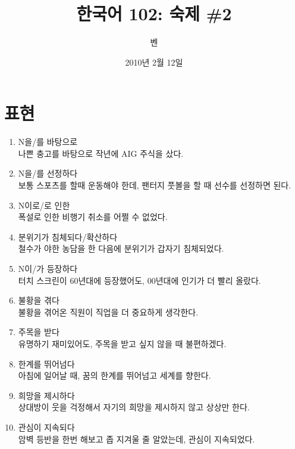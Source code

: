 \documentclass[11pt]{article}
\title{한국어 102: 숙제 \#2}
\author{벤}
\date{2010년 2월 12일}
\begin{document}
\maketitle
\thispagestyle{empty}
\pagestyle{empty}

\section{표현}
\begin{enumerate}
  \item N을/를 바탕으로 \\
나쁜 충고를 바탕으로 작년에 AIG 주식을 샀다.

  \item N을/를 선정하다 \\
보통 스포츠를 할때 운동해야 한데, 팬터지 풋볼을 할 때 선수를 선정하면 된다.

  \item N이로/로 인한 \\
폭설로 인한 비행기 취소를 어쩔 수 없었다.

  \item 분위기가 침체되다/확산하다 \\
철수가 야한 농담을 한 다음에 분위기가 갑자기 침체되었다.

  \item N이/가 등장하다 \\
터치 스크린이 60년대에 등장했어도, 00년대에 인기가 더 빨리 올랐다.

  \item 불황을 겪다 \\
불황을 겪어온 직원이 직업을 더 중요하게 생각한다.

  \item 주목을 받다 \\
유명하기 재미있어도, 주목을 받고 싶지 않을 때 불편하겠다.

  \item 한계를 뛰어넘다 \\
아침에 일어날 때, 꿈의 한계를 뛰어넘고 세계를 향한다.

  \item 희망을 제시하다 \\
상대방이 웃을 걱정해서 자기의 희망을 제시하지 않고 상상만 한다.

  \item 관심이 지속되다 \\
암벽 등반을 한번 해보고 좁 지겨울 줄 알았는데, 관심이 지속되었다.

\end{enumerate}
\end{document}
